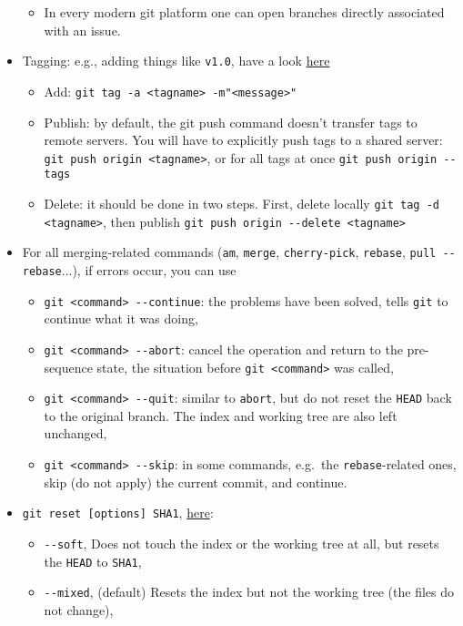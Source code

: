 \documentclass[a4paper,12pt,%
              final%
              ]{article}
\begin{document}
\begin{itemize}
\begin{itemize}
      \item In every modern git platform one can open branches directly associated with an issue.
    \end{itemize}
  \item Tagging: e.g., adding things like \texttt{v1.0}, have a look \href{https://git-scm.com/book/en/v2/Git-Basics-Tagging}{here}
    \begin{itemize}
      \item Add: \verb|git tag -a <tagname> -m"<message>"|
      \item Publish: by default, the git push command doesn't transfer tags to remote servers. You will have to explicitly push tags to a shared server: \verb|git push origin <tagname>|, or for all tags at once \verb|git push origin --tags|
      \item Delete: it should be done in two steps. First, delete locally \verb|git tag -d <tagname>|, then publish \verb|git push origin --delete <tagname>|
    \end{itemize}
  \item For all merging-related commands (\texttt{am}, \texttt{merge}, \texttt{cherry-pick}, \texttt{rebase}, \verb|pull --rebase|...), if errors occur, you can use
    \begin{itemize}
      \item \verb|git <command> --continue|: the problems have been solved, tells \texttt{git} to continue what it was doing,
      \item \verb|git <command> --abort|: cancel the operation and return to the pre-sequence state, the situation before \texttt{git <command>} was called,
      \item \verb|git <command> --quit|: similar to \texttt{abort}, but do not reset the \texttt{HEAD} back to the original branch. The index and working tree are also left unchanged,
      \item \verb|git <command> --skip|: in some commands, e.g.\ the \texttt{rebase}-related ones, skip (do not apply) the current commit, and continue.
    \end{itemize}
  \item \verb|git reset [options] SHA1|, \href{https://git-scm.com/docs/git-reset}{here}:
    \begin{itemize}
      \item \verb|--soft|, Does not touch the index or the working tree at all, but resets the \texttt{HEAD} to \texttt{SHA1},
      \item \verb|--mixed|, (default) Resets the index but not the working tree (the files do not change),

\end{itemize}
\end{itemize}
\end{document}
